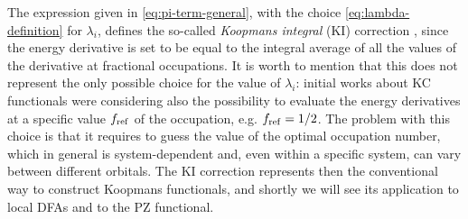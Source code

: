 The expression given in \cref{eq:pi-term-general}, with the choice \eqref{eq:lambda-definition} for $\lambda_i$, defines the so-called \emph{Koopmans integral} (KI) correction \cite{borghi_koopmans-compliant_2014}, since the energy derivative is set to be equal to the integral average of all the values of the derivative at fractional occupations. It is worth to mention that this does not represent the only possible choice for the value of $\lambda_i$: initial works about KC functionals \cite{dabo_non-koopmans_2009,dabo_koopmans_2010,borghi_koopmans-compliant_2014} were considering also the possibility to evaluate the energy derivatives at a specific value $f_{\rm ref}$ of the occupation, e.g. $f_{\rm ref}=1/2$. The problem with this choice is that it requires to guess the value of the optimal occupation number, which in general is system-dependent and, even within a specific system, can vary between different orbitals. The KI correction represents then the conventional way to construct Koopmans functionals, and shortly we will see its application to local DFAs and to the PZ functional.

